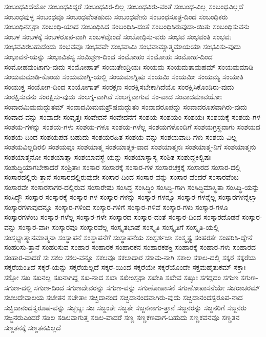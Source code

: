 {ಸಂಬಂಧವಿದೆಯೋ
ಸಂಬಂಧವಿದ್ದರೆ
ಸಂಬಂಧವಿರ-ಲಿಲ್ಲ
ಸಂಬಂಧವಿರು-ವಂತೆ
ಸಂಬಂಧ-ವಿಲ್ಲ
ಸಂಬಂಧವಿಲ್ಲದೆ
ಸಂಬಂಧವುಳ್ಳ
ಸಂಬಂಧವೂ
ಸಂಬಂಧವೆಂತಹುದು
ಸಂಬಂಧವೇನು
ಸಂಬಂಧಸೂತ್ರ-ದಿಂದ
ಸಂಬಂಧಿಕರು
ಸಂಬಂಧಿನಸ್ತಥಾ
ಸಂಬಂಧಿ-ಯಾದ
ಸಂಬಂಧಿಸಿದ
ಸಂಬಂಧಿಸಿ-ದಂತೆ
ಸಂಬಂಧಿಸಿರುವುದಾ-ಯಿತು
ಸಂಬಂಧಿಸುವನು
ಸಂಬಳ
ಸಂಬಳಕ್ಕೆ
ಸಂಬಳರೂಪ-ವಾಗಿ
ಸಂಬಳವೊಂದೆ
ಸಂಬೋಧಿಸು-ವರು
ಸಂಭವ
ಸಂಭವಂತಿ
ಸಂಭವಃ
ಸಂಭವವಿರಬಹುದೆಂದು
ಸಂಭವವೂ
ಸಂಭವವೇ
ಸಂಭವಾಮಿ
ಸಂಭವಾಮ್ಯಾತ್ಮಮಾಯಯಾ
ಸಂಭವಿಸು-ವುದು
ಸಂಭಾವನೆ-ಯನ್ನು
ಸಂಭಾವಿತಸ್ಯ
ಸಂಮಿಶ್ರಣ-ದಿಂದ
ಸಂಮೋಹಂ
ಸಂಮೋಹಃ
ಸಂಮೋಹ-ದಿಂದ
ಸಂಮೋಹವುಂಟಾಗು-ವುದು
ಸಂಮೋಹಾತ್
ಸಂಯತೇಂದ್ರಿಯಃ
ಸಂಯಮ
ಸಂಯಮತಾಮಹಮ್
ಸಂಯಮಮಾಡಿ
ಸಂಯಮಮಾಡಿ-ಕೊಂಡು
ಸಂಯಮಾಗ್ನಿ-ಯಲ್ಲಿ
ಸಂಯಮಾಗ್ನಿಷು
ಸಂಯಮಿ
ಸಂಯಮೀ
ಸಂಯಮ್ಯ
ಸಂಯಾತಿ
ಸಂಯುಕ್ತ
ಸಂಯೋಗ-ದಿಂದ
ಸಂಯೋಗಾತ್
ಸಂರಕ್ಷಣ
ಸಂರಕ್ಷಿಸಬೇಕಾಗಿದೆಯೊ
ಸಂರಕ್ಷಿಸಿಕೊಂಡಿರು-ವುದು
ಸಂರಕ್ಷಿಸುವನು
ಸಂರಕ್ಷಿಸು-ವುದು
ಸಂಲಗ್ನ-ವಾಗಿವೆ
ಸಂಲಗ್ನವಾಗುವ
ಸಂ-ವಾದ
ಸಂವಾದಮಾವಯೋಃ
ಸಂವಾದಮಿಮಮದ್ಭುತಮ್
ಸಂವಾದಮಿಮಮಶ್ರೌಷಮದ್ಭುತಂ
ಸಂವಾದರೂಪದ್ದು
ಸಂವಾದರೂಪವಾಗಿರು-ವುದು
ಸಂವಾದ-ವನ್ನು
ಸಂವಾದೇ
ಸಂವೃತ್ತಃ
ಸಂವೇದನೆ
ಸಂವೇದನೆಗೆ
ಸಂಶಯ
ಸಂಶಯಂ
ಸಂಶಯಃ
ಸಂಶಯಕ್ಕೆ
ಸಂಶಯ-ಗಳ
ಸಂಶಯ-ಗಳನ್ನು
ಸಂಶಯ-ಗಳು
ಸಂಶಯ-ಗಳೂ
ಸಂಶಯ-ಗಳೆಲ್ಲ
ಸಂಶಯಗಳೊಂದಿಗೆ
ಸಂಶಯಗ್ರಸ್ಥವಾಗು
ಸಂಶಯದ
ಸಂಶಯ-ದಿಂದ
ಸಂಶಯಪಡ-ಬಹುದು
ಸಂಶಯರಹಿತ
ಸಂಶಯ-ವನ್ನು
ಸಂಶಯವಾದಿ-ಗಳು
ಸಂಶಯ-ವಿಲ್ಲ
ಸಂಶಯವಿಲ್ಲದಿರಲಿ
ಸಂಶಯವೂ
ಸಂಶಯಾತ್ಮ
ಸಂಶಯಾತ್ಮಕ-ವಾದ
ಸಂಶಯಾತ್ಮನಃ
ಸಂಶಯಾತ್ಮ-ನಿಗೆ
ಸಂಶಯಾತ್ಮನು
ಸಂಶಯಾತ್ಮನೋ
ಸಂಶಯಾತ್ಮಾ
ಸಂಶಯಾವಸ್ಥೆ-ಯನ್ನು
ಸಂಶಯಾಸ್ಯಾಸ್ಯ
ಸಂಶಿತ
ಸಂಶುದ್ಧಕಿಲ್ಬಿಷಃ
ಸಂಶುದ್ಧಿಯಾಗಬೇಕಾದರೆ
ಸಂಶ್ರಿತಾಃ
ಸಂಸಾರ
ಸಂಸಾರಕ್ಕೆ
ಸಂಸಾರ-ಗಳ
ಸಂಸಾರಚಕ್ರಕ್ಕೆ
ಸಂಸಾರದ
ಸಂಸಾರ-ದಲ್ಲಿ
ಸಂಸಾರದಲ್ಲಿರು-ತ್ತಾನೆ
ಸಂಸಾರದಲ್ಲಿರುವುದೇ
ಸಂಸಾರ-ದಿಂದ
ಸಂಸಾರ-ವನ್ನು
ಸಂಸಾರ-ವೆಂದರೆ
ಸಂಸಾರವೆಂಬ
ಸಂಸಾರವೇ
ಸಂಸಾರಸಾಗರ-ದಲ್ಲಿರುವ
ಸಂಸಾರೇಷು
ಸಂಸಿದ್ಧ
ಸಂಸಿದ್ಧಿಂ
ಸಂಸಿದ್ಧಿ-ಗಾಗಿ
ಸಂಸಿದ್ಧಿಮಾಸ್ಥಿತಾ
ಸಂಸಿದ್ಧಿ-ಯನ್ನು
ಸಂಸಿದ್ಧೌ
ಸಂಸ್ಕಾರ
ಸಂಸ್ಕಾರಕ್ಕೆ
ಸಂಸ್ಕಾರ-ಗಳ
ಸಂಸ್ಕಾರ-ಗಳನ್ನು
ಸಂಸ್ಕಾರ-ಗಳನ್ನೂ
ಸಂಸ್ಕಾರ-ಗಳನ್ನೆಲ್ಲ
ಸಂಸ್ಕಾರಗಳನ್ನೆಲ್ಲಾ
ಸಂಸ್ಕಾರಗಳಾವುದನ್ನೂ
ಸಂಸ್ಕಾರ-ಗಳಿಂದ
ಸಂಸ್ಕಾರ-ಗಳಿಗೆ
ಸಂಸ್ಕಾರ-ಗಳಿವೆ
ಸಂಸ್ಕಾರ-ಗಳು
ಸಂಸ್ಕಾರ-ಗಳೂ
ಸಂಸ್ಕಾರಗಳೆಂಬ
ಸಂಸ್ಕಾರ-ಗಳೆಲ್ಲ
ಸಂಸ್ಕಾರ-ಗಳೇ
ಸಂಸ್ಕಾರದ
ಸಂಸ್ಕಾರ-ದಂತೆ
ಸಂಸ್ಕಾರ-ದಿಂದ
ಸಂಸ್ಕಾರದೊಡನೆ
ಸಂಸ್ಕಾರ-ವನ್ನು
ಸಂಸ್ಕಾರ-ವಾಗಿ
ಸಂಸ್ಕಾರವೂ
ಸಂಸ್ಕಾರವೆಲ್ಲ
ಸಂಸ್ಕೃತಭಾಷೆ
ಸಂಸ್ಕೃತಿ
ಸಂಸ್ಕೃತಿಗೆ
ಸಂಸ್ಕೃತಿ-ಯಲ್ಲಿ
ಸಂಸ್ತಭ್ಯಾತ್ಮಾನಮಾತ್ಮನಾ
ಸಂಸ್ಥಾಪನೆ
ಸಂಸ್ಥಾಪನೆಗೆ
ಸಂಸ್ಥಾಪನೆಯ
ಸಂಸ್ಪರ್ಶಜಾ
ಸಂಸ್ಮೃತ್ಯ
ಸಂಹರತೇ
ಸಂಹರಿಸಿ-ದ್ದೇನೆ
ಸಂಹರಿಸು-ತ್ತಾನೆ
ಸಂಹರಿಸುವ
ಸಂಹಾರ
ಸಂಹಾರಕ
ಸಂಹಾರಕನ
ಸಂಹಾರಕಶಕ್ತಿ
ಸಂಹಾರಕ್ಕೆ
ಸಂಹಾರ-ಗಳು
ಸಂಹಾರದ
ಸಂಹಾರ-ವಾದರೆ
ಸಃ
ಸಕಲ
ಸಕಲ-ವನ್ನೂ
ಸಕಲವೂ
ಸಕಲಾಧಾರ
ಸಕಾಮ-ನಾಗಿ
ಸಕಾಲ
ಸಕಾಲ-ದಲ್ಲಿ
ಸಕ್ಕರೆ
ಸಕ್ಕರೆಯ
ಸಕ್ಕರೆಯಂತಿದೆ
ಸಕ್ಕರೆ-ಯನ್ನು
ಸಕ್ಕರೆಯಲ್ಲದೆ
ಸಕ್ಕರೆ-ಯಿಂದ
ಸಕ್ಕರೆಯೇ
ಸಕ್ಕರೆಯೊಂದೇ
ಸಕ್ತಮಹೈತುಕಮ್
ಸಕ್ತಾಃ
ಸಕ್ತೋ
ಸಖ
ಸಖನಲ್ಲ
ಸಖನಾಗಿದ್ದ
ಸಖ-ನಾದ
ಸಖಾ
ಸಖೀಂಸ್ತಥಾ
ಸಖೇತಿ
ಸಖೇವ
ಸಖ್ಯುಃ
ಸಗದ್ಗದಂ
ಸಗುಣ
ಸಗುಣ-
ಸಗುಣ-ದಲ್ಲಿ
ಸಗುಣ-ದಿಂದ
ಸಗುಣದೇವರನ್ನು
ಸಗುಣ-ವನ್ನು
ಸಗುಣೋಪಾಸನೆ
ಸಗುಣೋಪಾಸನೆಯೇ
ಸಚರಾಚರಮ್
ಸಚಲದೇವಾಲಯ
ಸಚೇತನ
ಸಚೇತಾಃ
ಸಚ್ಚಿದಾನಂದ
ಸಚ್ಚಿದಾನಂದವಾಗಿರು-ವುದು
ಸಚ್ಚಿದಾನಂದಸ್ವರೂಪ-ನಾದ
ಸಚ್ಚಿದಾನಂದಸ್ವರೂಪ-ವನ್ನು
ಸಚ್ಛಬ್ದಃ
ಸಜ
ಸಜ್ಜಂತೇ
ಸಜ್ಜತೇ
ಸಜ್ಜನನಾಗು-ತ್ತಾನೆ
ಸಜ್ಜನರನ್ನು
ಸಜ್ಜನರಿಗೆ
ಸಜ್ಜನರು
ಸಜ್ಜನರುಎಂದರೆ
ಸಡಿಲ
ಸಡಿಲವಾಗುತ್ತ
ಸಡಿಲ-ವಾದರೆ
ಸಣ್ಣ
ಸಣ್ಣಕಣವಾಗ-ಬಹುದು
ಸಣ್ಣಕವನವೊ
ಸಣ್ಣತನ
ಸಣ್ಣತನಕ್ಕೆ
ಸಣ್ಣತನವಿಲ್ಲದೆ
}
